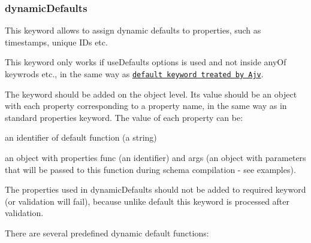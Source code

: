 \subsubsection*{{\ttfamily dynamic\+Defaults}}

This keyword allows to assign dynamic defaults to properties, such as timestamps, unique I\+Ds etc.

This keyword only works if {\ttfamily use\+Defaults} options is used and not inside {\ttfamily any\+Of} keywrods etc., in the same way as \href{https://github.com/epoberezkin/ajv#assigning-defaults}{\tt default keyword treated by Ajv}.

The keyword should be added on the object level. Its value should be an object with each property corresponding to a property name, in the same way as in standard {\ttfamily properties} keyword. The value of each property can be\+:


\begin{DoxyItemize}
\item an identifier of default function (a string)
\item an object with properties {\ttfamily func} (an identifier) and {\ttfamily args} (an object with parameters that will be passed to this function during schema compilation -\/ see examples).
\end{DoxyItemize}

The properties used in {\ttfamily dynamic\+Defaults} should not be added to {\ttfamily required} keyword (or validation will fail), because unlike {\ttfamily default} this keyword is processed after validation.

There are several predefined dynamic default functions\+:



